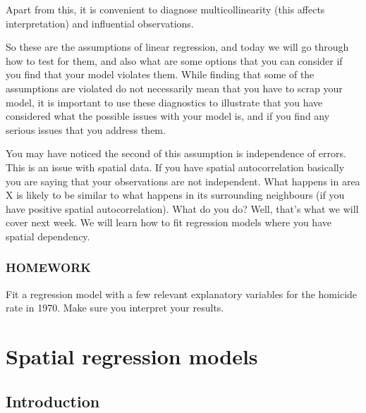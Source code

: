 \documentclass[]{book}
\begin{document}
Apart from this, it is convenient to diagnose multicollinearity (this affects interpretation) and influential observations.

So these are the assumptions of linear regression, and today we will go through how to test for them, and also what are some options that you can consider if you find that your model violates them. While finding that some of the assumptions are violated do not necessarily mean that you have to scrap your model, it is important to use these diagnostics to illustrate that you have considered what the possible issues with your model is, and if you find any serious issues that you address them.

You may have noticed the second of this assumption is independence of errors. This is an issue with spatial data. If you have spatial autocorrelation basically you are saying that your observations are not independent. What happens in area X is likely to be similar to what happens in its surrounding neighbours (if you have positive spatial autocorrelation). What do you do? Well, that's what we will cover next week. We will learn how to fit regression models where you have spatial dependency.

\hypertarget{homework-5}{%
\subsection{HOMEWORK}\label{homework-5}}

Fit a regression model with a few relevant explanatory variables for the homicide rate in 1970. Make sure you interpret your results.

\hypertarget{spatial-regression-models}{%
\chapter{Spatial regression models}\label{spatial-regression-models}}

\hypertarget{introduction-3}{%
\section{Introduction}\label{introduction-3}}
\end{document}
